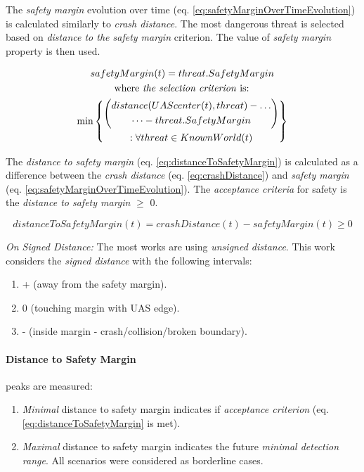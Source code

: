The \emph{safety margin} evolution over time (eq. \ref{eq:safetyMarginOverTimeEvolution}) is calculated similarly to \emph{crash distance}. The most dangerous threat is selected based on \emph{distance to the safety margin} criterion. The value of \emph{safety margin} property is then used.

\begin{multline}\label{eq:safetyMarginOverTimeEvolution}
    safety Margin(t) =  threat.SafetyMargin\\\text{  where \emph{the selection criterion} is:  }\\ \min \left\{\begin{gathered}\left( \begin{gathered} distance(UAScenter(t),threat)-\dots\\\dots-threat.SafetyMargin\end{gathered}\right)\\:\forall threat \in KnownWorld (t)\end{gathered}\right\}
\end{multline}

\noindent The \emph{distance to safety margin} (eq. \ref{eq:distanceToSafetyMargin}) is calculated as a difference between the \emph{crash distance} (eq. \ref{eq:crashDistance}) and \emph{safety margin} (eq. \ref{eq:safetyMarginOverTimeEvolution}). The \emph{acceptance criteria} for safety is the \emph{distance to safety margin} $\ge$ 0.

\begin{equation}\label{eq:distanceToSafetyMargin}
    distanceToSafetyMargin(t) =  crashDistance(t) - safetyMargin(t) \ge 0
\end{equation}

\begin{note}
\emph{On Signed Distance:} The most works are using \emph{unsigned distance}. This work considers the \emph{signed distance} with the  following intervals:

\begin{enumerate}
	\item + (away from the safety margin).
	
	\item 0 (touching margin with UAS edge).
	
	\item - (inside margin - crash/collision/broken boundary).
\end{enumerate}
\end{note}

\paragraph{Distance to Safety Margin} peaks are measured:
\begin{enumerate}
    \item \emph{Minimal} distance to safety margin indicates if \emph{acceptance criterion} (eq. \ref{eq:distanceToSafetyMargin} is met).
    \item \emph{Maximal} distance to safety margin indicates the future \emph{minimal detection range}. All scenarios were considered as borderline cases.
\end{enumerate}

